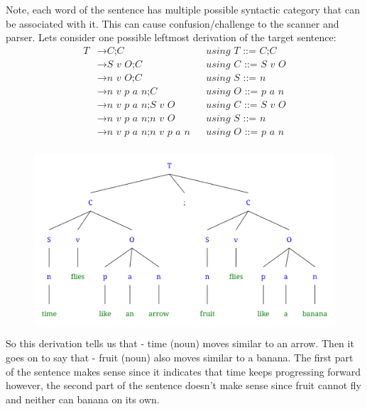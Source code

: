 \documentclass{article}
\begin{document}
    Note, each word of the sentence has multiple possible syntactic category that can be associated with it. This can cause confusion/challenge to the scanner and parser. Lets consider one possible leftmost derivation of the target sentence:
    \begin{align*}
        T   & \rightarrow \textit{C;C}               && \textit{using T ::= C;C}     \\
            & \rightarrow \textit{S v O;C}           && \textit{using C ::= S v O}   \\
            & \rightarrow \textit{n v O;C}           && \textit{using S ::= n}       \\
            & \rightarrow \textit{n v p a n;C}       && \textit{using O ::= p a n}   \\
            & \rightarrow \textit{n v p a n;S v O}   && \textit{using C ::= S v O}   \\
            & \rightarrow \textit{n v p a n;n v O}   && \textit{using S ::= n}       \\
            & \rightarrow \textit{n v p a n;n v p a n} && \textit{using O ::= p a n} \\
    \end{align*}

    \begin{figure}[H]
        \includegraphics[width=1\textwidth]{hw2-3q1.png}
    \end{figure}

    So this derivation tells us that - time (noun) moves similar to an arrow. Then it goes on to say that - fruit (noun) also moves similar to a banana. The first part of the sentence makes sense since it indicates that time keeps progressing forward however, the second part of the sentence doesn't make sense since fruit cannot fly and neither can banana on its own.
\end{document}
